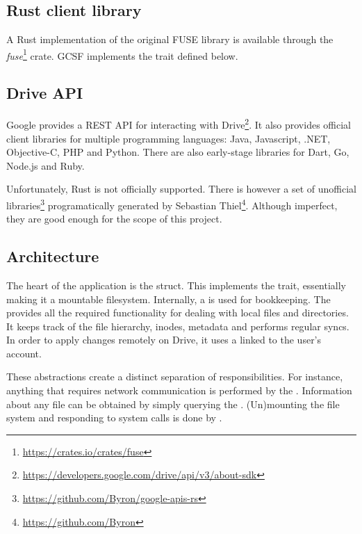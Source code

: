 \subsection{Rust client library}

A Rust implementation of the original FUSE library is available through the \emph{fuse}\footnote{\url{https://crates.io/crates/fuse}} crate. GCSF implements the  trait defined below.



\subsection{Drive API}

Google provides a REST API for interacting with Drive\footnote{\url{https://developers.google.com/drive/api/v3/about-sdk}}. It also provides official client libraries for multiple programming languages: Java, Javascript, .NET, Objective-C, PHP and Python. There are also early-stage libraries for Dart, Go, Node.js and Ruby.

Unfortunately, Rust is not officially supported. There is however a set of unofficial libraries\footnote{\url{https://github.com/Byron/google-apis-rs}}  programatically generated by Sebastian Thiel\footnote{\url{https://github.com/Byron}}. Although imperfect, they are good enough for the scope of this project.

\subsection{Architecture}

The heart of the application is the  struct. This implements the  trait, essentially making it a mountable filesystem. Internally, a  is used for bookkeeping. The  provides all the required functionality for dealing with local files and directories. It keeps track of the file hierarchy, inodes, metadata and performs regular syncs. In order to apply changes remotely on Drive, it uses a  linked to the user's account.

These abstractions create a distinct separation of responsibilities. For instance, anything that requires network communication is performed by the . Information about any file can be obtained by simply querying the . (Un)mounting the file system and responding to system calls is done by .


